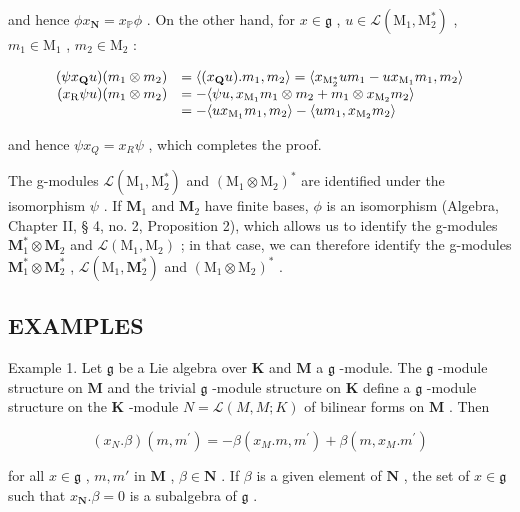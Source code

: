 and hence \(\phi x_{\mathbf{N}} = x_{\mathbb{P}}\phi\) . On the other hand, for \(x \in \mathfrak{g}\) , \(u \in \mathcal{L}(\mathrm{M}_1, \mathrm{M}_2^*)\) , \(m_1 \in \mathrm{M}_1\) , \(m_2 \in \mathrm{M}_2\) :

\[
\begin{array}{r l} (\psi x _ {\mathbf {Q}} u) (m _ {1} \otimes m _ {2}) & = \langle (x _ {\mathbf {Q}} u). m _ {1}, m _ {2} \rangle = \langle x _ {\mathrm{M} _ {2} ^ {*}} u m _ {1} - u x _ {\mathrm{M} _ {1}} m _ {1}, m _ {2} \rangle \\ (x _ {\mathrm{R}} \psi u) (m _ {1} \otimes m _ {2}) & = - \langle \psi u, x _ {\mathrm{M} _ {1}} m _ {1} \otimes m _ {2} + m _ {1} \otimes x _ {\mathrm{M} _ {2}} m _ {2} \rangle \\ & = - \langle u x _ {\mathrm{M} _ {1}} m _ {1}, m _ {2} \rangle - \langle u m _ {1}, x _ {\mathrm{M} _ {2}} m _ {2} \rangle \end{array}
\]

and hence \(\psi x_{Q} = x_{R}\psi\) , which completes the proof.

The g-modules \(\mathcal{L}(\mathrm{M}_1,\mathrm{M}_2^*)\) and \((\mathrm{M}_1\otimes \mathrm{M}_2)^*\) are identified under the isomorphism \(\psi\) . If \(\mathbf{M}_1\) and \(\mathbf{M}_2\) have finite bases, \(\phi\) is an isomorphism (Algebra, Chapter II, § 4, no. 2, Proposition 2), which allows us to identify the g-modules \(\mathbf{M}_1^*\otimes \mathbf{M}_2\) and \(\mathcal{L}(\mathrm{M}_1,\mathrm{M}_2)\) ; in that case, we can therefore identify the g-modules \(\mathbf{M}_1^*\otimes \mathbf{M}_2^*\) , \(\mathcal{L}(\mathrm{M}_1,\mathbf{M}_2^*)\) and \((\mathrm{M}_1\otimes \mathrm{M}_2)^*\) .

\subsection{EXAMPLES}

Example 1. Let \(\mathfrak{g}\) be a Lie algebra over \(\mathbf{K}\) and \(\mathbf{M}\) a \(\mathfrak{g}\) -module. The \(\mathfrak{g}\) -module structure on \(\mathbf{M}\) and the trivial \(\mathfrak{g}\) -module structure on \(\mathbf{K}\) define a \(\mathfrak{g}\) -module structure on the \(\mathbf{K}\) -module \(N = \mathcal{L}(M, M; K)\) of bilinear forms on \(\mathbf{M}\) . Then

\[
(x _ {N}. \beta) (m, m ^ {\prime}) = - \beta (x _ {M}. m, m ^ {\prime}) + \beta (m, x _ {M}. m ^ {\prime})\tag{10}
\]

for all \(x \in \mathfrak{g}\) , \(m, m'\) in \(\mathbf{M}\) , \(\beta \in \mathbf{N}\) . If \(\beta\) is a given element of \(\mathbf{N}\) , the set of \(x \in \mathfrak{g}\) such that \(x_{\mathbf{N}}. \beta = 0\) is a subalgebra of \(\mathfrak{g}\) .

